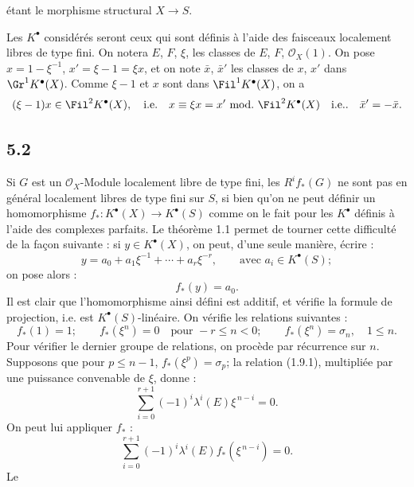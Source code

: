 étant le morphisme structural $X\longrightarrow S$.

Les $K^{\bullet}$ considérés seront ceux qui sont définis à l'aide des faisceaux localement libres de type fini. On notera $E$, $F$, $\xi$, les classes de $E$, $F$, $\mathcal O_X(1)$. On pose $x=1-\xi^{-1}$, $x'=\xi-1=\xi x$, et on note $\bar x$, $\bar x'$ les classes de $x$, $x'$ dans $\Gr^1K^{\bullet}(X)$. Comme $\xi-1$ et $x$ sont dans $\Fil^1K^{\bullet}(X)$, on a
\[
  (\xi-1)x\in\Fil^2K^{\bullet}(X),
  \quad\text{i.e.}\quad x\equiv \xi x=x' \ \mathrm{mod.}\ \Fil^2K^{\bullet}(X)
  \quad\text{i.e..}\quad \bar x'= -\bar x .
\]

\subsection*{5.2}
Si $G$ est un $\mathcal O_X$-Module localement libre de type fini, les $R^if_*(G)$ ne sont pas en général localement libres de type fini sur $S$, si bien qu'on ne peut définir un homomorphisme $f_*:K^{\bullet}(X)\to K^{\bullet}(S)$ comme on le fait pour les $K^{\bullet}$ définis à l'aide des complexes parfaits. Le théorème 1.1 permet de tourner cette difficulté de la façon suivante : si $y\in K^{\bullet}(X)$, on peut, d'une seule manière, écrire :
\begin{equation}\tag{5.2.1}
  y=a_0+a_1\xi^{-1}+\cdots+a_r\xi^{-r},\qquad \text{avec } a_i\in K^{\bullet}(S);
\end{equation}
on pose alors :
\begin{equation}\tag{5.2.2}
  f_*(y)=a_0 .
\end{equation}
Il est clair que l'homomorphisme ainsi défini est additif, et vérifie la formule de projection, i.e. est $K^{\bullet}(S)$-linéaire. On vérifie les relations suivantes :
\begin{equation}\tag{5.2.3}
  f_*(1)=1;\qquad
  f_*(\xi^n)=0\quad\text{pour }-r\le n<0;\qquad
  f_*(\xi^n)=\sigma_n,
  \quad 1\le n .
\end{equation}
Pour vérifier le dernier groupe de relations, on procède par récurrence sur $n$. Supposons que pour $p\le n-1$, $f_*(\xi^p)=\sigma_p$; la relation (1.9.1), multipliée par une puissance convenable de $\xi$, donne :
\[
  \sum_{i=0}^{r+1}(-1)^i\lambda^i(E)\xi^{\,n-i}=0 .
\]
On peut lui appliquer $f_*$ :
\[
  \sum_{i=0}^{r+1}(-1)^i\lambda^i(E)f_*(\xi^{\,n-i})=0 .
\]
Le
